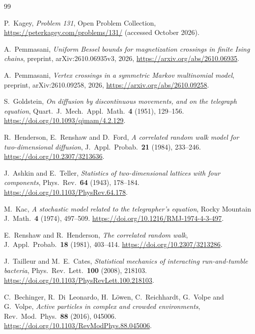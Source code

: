 \documentclass[11pt]{article}
\theoremstyle{definition}
\theoremstyle{remark}
\begin{document}
\begin{thebibliography}{99}\small\setlength{\baselineskip}{11pt}\setlength{\itemsep}{0pt}\setlength{\parsep}{0pt}

P.~Kagey, \emph{Problem 131}, Open Problem Collection,
\url{https://peterkagey.com/problems/131/} (accessed October 2026).

A.~Pemmasani, \emph{Uniform Bessel bounds for magnetization crossings in
finite Ising chains}, preprint, arXiv:2610.06935v3, 2026,
\url{https://arxiv.org/abs/2610.06935}.

A.~Pemmasani, \emph{Vertex crossings in a symmetric Markov multinomial
model}, preprint, arXiv:2610.09258, 2026,
\url{https://arxiv.org/abs/2610.09258}.

S.~Goldstein, \emph{On diffusion by discontinuous movements, and on the
telegraph equation}, Quart.~J.~Mech.~Appl.~Math.~\textbf{4} (1951), 129--156.
\url{https://doi.org/10.1093/qjmam/4.2.129}.

R.~Henderson, E.~Renshaw and D.~Ford, \emph{A correlated random walk model
for two-dimensional diffusion}, J.~Appl.~Probab.~\textbf{21} (1984),
233--246. \url{https://doi.org/10.2307/3213636}.

J.~Ashkin and E.~Teller, \emph{Statistics of two-dimensional lattices with
four components}, Phys.~Rev.~\textbf{64} (1943), 178--184.
\url{https://doi.org/10.1103/PhysRev.64.178}.

M.~Kac, \emph{A stochastic model related to the telegrapher's equation},
Rocky Mountain J.~Math.~\textbf{4} (1974), 497--509.
\url{https://doi.org/10.1216/RMJ-1974-4-3-497}.

E.~Renshaw and R.~Henderson, \emph{The correlated random walk},
J.~Appl.~Probab.~\textbf{18} (1981), 403--414.
\url{https://doi.org/10.2307/3213286}.

J.~Tailleur and M.~E.~Cates, \emph{Statistical mechanics of interacting
run-and-tumble bacteria}, Phys.~Rev.~Lett.~\textbf{100} (2008), 218103.
\url{https://doi.org/10.1103/PhysRevLett.100.218103}.

C.~Bechinger, R.~Di~Leonardo, H.~L\"owen, C.~Reichhardt, G.~Volpe and
G.~Volpe, \emph{Active particles in complex and crowded environments},
Rev.~Mod.~Phys.~\textbf{88} (2016), 045006.
\url{https://doi.org/10.1103/RevModPhys.88.045006}.


\end{thebibliography}
\end{document}
